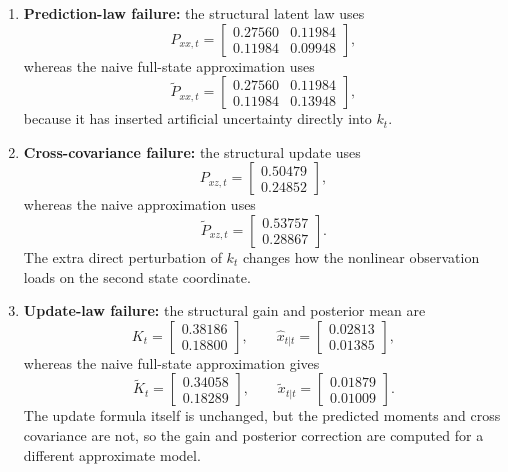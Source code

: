 \begin{enumerate}[label=(\roman*)]
  \item \textbf{Prediction-law failure:}
    the structural latent law uses
    \[
      P_{xx,t}
      =
      \begin{bmatrix}
        0.27560 & 0.11984\\
        0.11984 & 0.09948
      \end{bmatrix},
    \]
    whereas the naive full-state approximation uses
    \[
      \tilde P_{xx,t}
      =
      \begin{bmatrix}
        0.27560 & 0.11984\\
        0.11984 & 0.13948
      \end{bmatrix},
    \]
    because it has inserted artificial uncertainty directly into $k_t$.
  \item \textbf{Cross-covariance failure:}
    the structural update uses
    \[
      P_{xz,t}
      =
      \begin{bmatrix}
        0.50479\\ 0.24852
      \end{bmatrix},
    \]
    whereas the naive approximation uses
    \[
      \tilde P_{xz,t}
      =
      \begin{bmatrix}
        0.53757\\ 0.28867
      \end{bmatrix}.
    \]
    The extra direct perturbation of $k_t$ changes how the nonlinear
    observation loads on the second state coordinate.
  \item \textbf{Update-law failure:}
    the structural gain and posterior mean are
    \[
      K_t
      =
      \begin{bmatrix}
        0.38186\\ 0.18800
      \end{bmatrix},
      \qquad
      \hat x_{t|t}
      =
      \begin{bmatrix}
        0.02813\\ 0.01385
      \end{bmatrix},
    \]
    whereas the naive full-state approximation gives
    \[
      \tilde K_t
      =
      \begin{bmatrix}
        0.34058\\ 0.18289
      \end{bmatrix},
      \qquad
      \tilde x_{t|t}
      =
      \begin{bmatrix}
        0.01879\\ 0.01009
      \end{bmatrix}.
    \]
    The update formula itself is unchanged, but the predicted moments and cross
    covariance are not, so the gain and posterior correction are computed for a
    different approximate model.
\end{enumerate}

